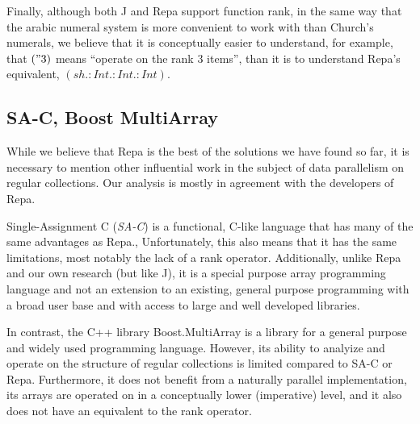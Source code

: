 Finally, although both J and Repa support function rank, 
in the same way that the arabic numeral system is more convenient to work with than Church's numerals, 
we believe that it is conceptually easier to understand, for example, that $(" 3)$ means ``operate on the rank 3 items'', than it is to understand Repa's equivalent, $(sh.:Int.:Int.:Int)$.

\subsection{SA-C, Boost MultiArray}
While we believe that Repa is the best of the solutions we have found so far, 
it is necessary to mention other influential work in the subject of data parallelism on regular collections.
Our analysis is mostly in agreement with the developers of Repa.\cite{dph}

Single-Assignment C (\textit{SA-C}) is a functional, C-like language 
that has many of the same advantages as Repa.\cite{dph}, %
Unfortunately, this also means that it has the same limitations, most notably the lack of a rank operator.
Additionally, unlike Repa and our own research (but like J), 
it is a special purpose array programming language and 
not an extension to an existing, general purpose programming with a broad user base and 
with access to large and well developed libraries.

In contrast, the C++ library Boost.MultiArray is a library for a general purpose and widely used programming language. %
However, its ability to analyize and operate on the structure of regular collections is limited compared to SA-C or Repa.
Furthermore, it does not benefit from a naturally parallel implementation, 
its arrays are operated on in a conceptually lower (imperative) level, 
and it also does not have an equivalent to the rank operator. 
